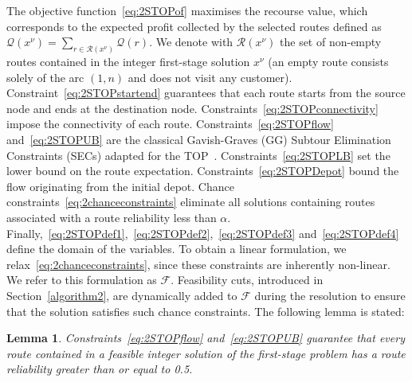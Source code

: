 \documentclass[11pt]{article}
\newtheorem{lemma}[theorem]{Lemma}
\theoremstyle{definition}
\begin{document}
The objective function~\eqref{eq:2STOPof} maximises the recourse value, which corresponds to the expected profit collected by the selected routes defined as $\mathcal{Q}(x^{\nu}) = \sum_{r \in \mathcal{R}(x^\nu)} \mathcal{Q}(r)$. We denote with $\mathcal{R}(x^{\nu})$ the set of non-empty routes contained in the integer first-stage solution $x^{\nu}$ (an empty route consists solely of the arc $(1,n)$ and does not visit any customer).
%
Constraint~\eqref{eq:2STOPstartend} guarantees that each route starts from the source node and ends at the destination node.
Constraints~\eqref{eq:2STOPconnectivity} impose the connectivity of each route. Constraints~\eqref{eq:2STOPflow} and~\eqref{eq:2STOPUB} are the classical Gavish-Graves (GG) Subtour Elimination Constraints (SECs) adapted for the TOP~\citep{Gavish1978}. Constraints~\eqref{eq:2STOPLB} set the lower bound on the route expectation.
Constraints~\eqref{eq:2STOPDepot} bound the flow originating from the initial depot. Chance constraints~\eqref{eq:2chanceconstraints} eliminate all solutions containing routes associated with a route reliability less than $\alpha$. Finally,~\eqref{eq:2STOPdef1},~\eqref{eq:2STOPdef2},~\eqref{eq:2STOPdef3} and~\eqref{eq:2STOPdef4} define the domain of the variables.
%
%
%
%
To obtain a linear formulation, we relax~\eqref{eq:2chanceconstraints}, since these constraints are inherently non-linear. We refer to this formulation as $\mathscr{F}$. Feasibility cuts, introduced in Section~\ref{algorithm2}, are dynamically added to $\mathscr{F}$ during the resolution to ensure that the solution satisfies such chance constraints. The following lemma is stated:

\begin{lemma}
	\label{lem:lemma1}
	Constraints~\eqref{eq:2STOPflow} and~\eqref{eq:2STOPUB} guarantee that every route contained in a feasible integer solution of the first-stage problem has a route reliability greater than or equal to 0.5.
\end{lemma}
\end{document}
